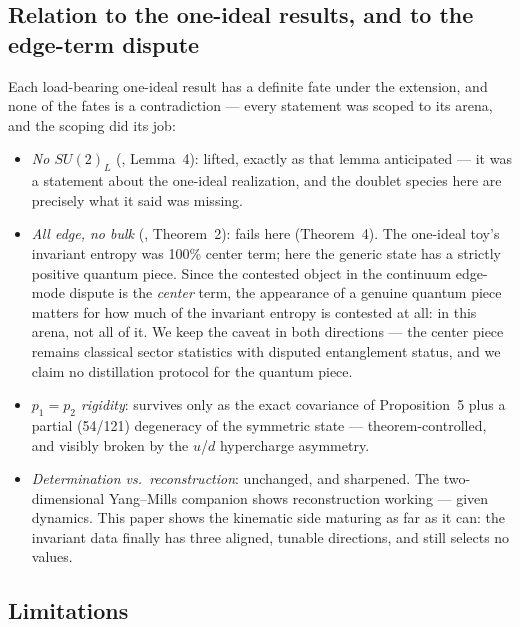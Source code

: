 \documentclass[11pt]{article}
\begin{document}
\subsection{Relation to the one-ideal results, and to the edge-term dispute}

Each load-bearing one-ideal result has a definite fate under the extension, and none of the fates is a contradiction --- every statement was scoped to its arena, and the scoping did its job:

\begin{itemize}
\item \emph{No $SU(2)_L$} (\cite{p2}, Lemma~4): lifted, exactly as that lemma anticipated --- it was a statement about the one-ideal realization, and the doublet species here are precisely what it said was missing.
\item \emph{All edge, no bulk} (\cite{p2}, Theorem~2): fails here (Theorem~4). The one-ideal toy's invariant entropy was 100\% center term; here the generic state has a strictly positive quantum piece. Since the contested object in the continuum edge-mode dispute \cite{chmp,soni} is the \emph{center} term, the appearance of a genuine quantum piece matters for how much of the invariant entropy is contested at all: in this arena, not all of it. We keep the caveat in both directions --- the center piece remains classical sector statistics with disputed entanglement status, and we claim no distillation protocol for the quantum piece.
\item \emph{$p_1 = p_2$ rigidity}: survives only as the exact covariance of Proposition~5 plus a partial (54/121) degeneracy of the symmetric state --- theorem-controlled, and visibly broken by the $u$/$d$ hypercharge asymmetry.
\item \emph{Determination vs.\ reconstruction}: unchanged, and sharpened. The two-dimensional Yang--Mills companion \cite{ym2} shows reconstruction working --- given dynamics. This paper shows the kinematic side maturing as far as it can: the invariant data finally has three aligned, tunable directions, and still selects no values.
\end{itemize}

\subsection{Limitations}
\end{document}
